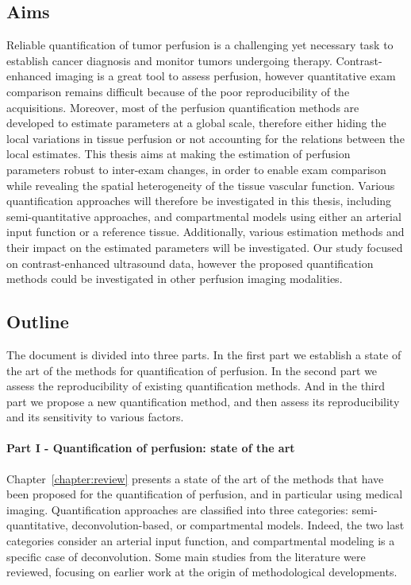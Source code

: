 \subsection{Aims}
Reliable quantification of tumor perfusion is a challenging yet necessary task to establish cancer diagnosis and monitor tumors undergoing therapy.
Contrast-enhanced imaging is a great tool to assess perfusion, however quantitative exam comparison remains difficult because of the poor reproducibility of the acquisitions.
Moreover, most of the perfusion quantification methods are developed to estimate parameters at a global scale, therefore either hiding the local variations in tissue perfusion or not accounting for the relations between the local estimates.
This thesis aims at making the estimation of perfusion parameters robust to inter-exam changes, in order to enable exam comparison while revealing the spatial heterogeneity of the tissue vascular function.
Various quantification approaches will therefore be investigated in this thesis, including semi-quantitative approaches, and compartmental models using either an arterial input function or a reference tissue.
Additionally, various estimation methods and their impact on the estimated parameters will be investigated.
Our study focused on contrast-enhanced ultrasound data, however the proposed quantification methods could be investigated in other perfusion imaging modalities.

\subsection{Outline}
The document is divided into three parts. 
In the first part we establish a state of the art of the methods for quantification of perfusion.
In the second part we assess the reproducibility of existing quantification methods.
And in the third part we propose a new quantification method, and then assess its reproducibility and its sensitivity to various factors.

\paragraph{Part I - Quantification of perfusion: state of the art}
Chapter~\ref{chapter:review} presents a state of the art of the methods that have been proposed for the quantification of perfusion, and in particular using medical imaging.
Quantification approaches are classified into three categories: semi-quantitative, deconvolution-based, or compartmental models.
Indeed, the two last categories consider an arterial input function, and compartmental modeling is a specific case of deconvolution.
Some main studies from the literature were reviewed, focusing on earlier work at the origin of methodological developments.



